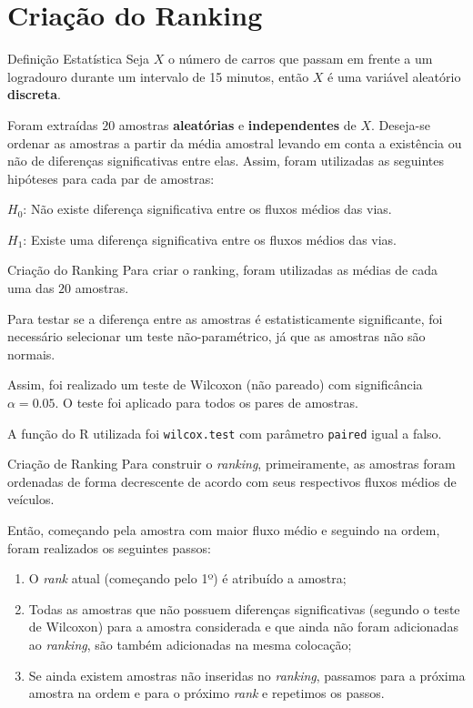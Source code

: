 \section{Criação do Ranking}

\begin{frame}{Definição Estatística}
Seja $X$ o número de carros que passam em frente a um logradouro durante um
intervalo de 15 minutos, então $X$ é uma variável aleatório \textbf{discreta}.

Foram extraídas $20$ amostras \textbf{aleatórias} e \textbf{independentes} de
$X$. Deseja-se ordenar as amostras a partir da média amostral levando em conta
a existência ou não de diferenças significativas entre elas. Assim, foram
utilizadas as seguintes hipóteses para cada par de amostras:

\vskip 0.5cm

$H_{0}$: Não existe diferença significativa entre os fluxos médios das vias.

$H_{1}$: Existe uma diferença significativa entre os fluxos médios das vias.
\end{frame}

\begin{frame}{Criação do Ranking}
Para criar o ranking, foram utilizadas as médias de cada uma das $20$ amostras.

\vskip 0.2cm

Para testar se a diferença entre as amostras é estatisticamente significante,
foi necessário selecionar um teste não-paramétrico, já que as amostras não são
normais.

\vskip 0.2cm

Assim, foi realizado um teste de Wilcoxon (não pareado) com significância
$\alpha = 0.05$. O teste foi aplicado para todos os pares de amostras.

\vskip 0.2cm

A função do R utilizada foi \texttt{wilcox.test} com parâmetro \texttt{paired}
igual a falso.
\end{frame}

\begin{frame}{Criação de Ranking}
Para construir o \textit{ranking}, primeiramente, as amostras foram ordenadas de
forma decrescente de acordo com seus respectivos fluxos médios de veículos.

Então, começando pela amostra com maior fluxo médio e seguindo na ordem, foram
realizados os seguintes passos:
\begin{enumerate}
	\item O \textit{rank} atual (começando pelo 1º) é atribuído a amostra;
	\item Todas as amostras que não possuem diferenças significativas (segundo o
	teste de Wilcoxon) para a amostra considerada e que ainda não foram
	adicionadas ao \textit{ranking}, são também adicionadas na mesma colocação;
	\item Se ainda existem amostras não inseridas no \textit{ranking}, passamos
	para a próxima amostra na ordem e para o próximo \textit{rank} e repetimos
	os passos.
\end{enumerate}
\end{frame}

